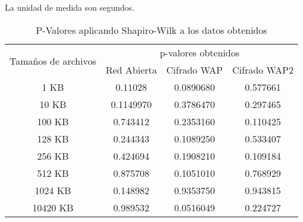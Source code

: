 
            La unidad de medida son segundos.
            \begin{table}[H]
                    \begin{tabular}{|c|c|c|c|}
                        \hline \multirow{2}{*}{Tamaños de archivos}&\multicolumn{3}{c|}{p-valores obtenidos}\\\cline{2-4}
                        &Red Abierta& Cifrado WAP&Cifrado WAP2\\\hline
                        1 KB &0.11028&0.0890680&0.577661\\\hline
                        10 KB &0.1149970&0.3786470&0.297465\\\hline
                        100 KB &0.743412&0.2353160&0.110425\\\hline
                        128 KB &0.244343&0.1089250&0.533407\\\hline
                        256 KB &0.424694&0.1908210&0.109184\\\hline
                        512 KB &0.875708&0.1051010&0.768929\\\hline
                        1024 KB &0.148982&0.9353750&0.943815\\\hline
                        10420 KB &0.989532&0.0516049&0.224727\\\hline
                    \end{tabular}
                    \caption{P-Valores aplicando Shapiro-Wilk a los datos obtenidos}
                    \label{tab:normalidad}
                \end{table}
